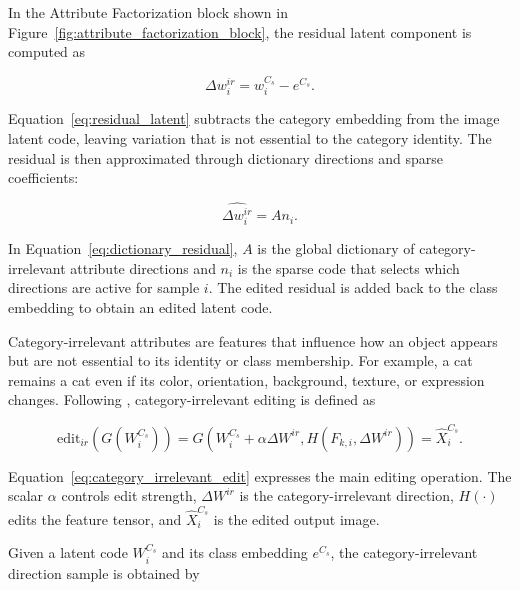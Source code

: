 In the Attribute Factorization block shown in Figure~\ref{fig:attribute_factorization_block}, the residual latent component is computed as

\begin{equation}
    \Delta w_i^{ir} = w_i^{C_s} - e^{C_s}.
    \label{eq:residual_latent}
\end{equation}

Equation~\eqref{eq:residual_latent} subtracts the category embedding from the image latent code, leaving variation that is not essential to the category identity. The residual is then approximated through dictionary directions and sparse coefficients:

\begin{equation}
    \widehat{\Delta w_i^{ir}} = A n_i.
    \label{eq:dictionary_residual}
\end{equation}

In Equation~\eqref{eq:dictionary_residual}, $A$ is the global dictionary of category-irrelevant attribute directions and $n_i$ is the sparse code that selects which directions are active for sample $i$. The edited residual is added back to the class embedding to obtain an edited latent code.

Category-irrelevant attributes are features that influence how an object appears but are not essential to its identity or class membership. For example, a cat remains a cat even if its color, orientation, background, texture, or expression changes. Following \citet{ding2023stableattributegroupediting}, category-irrelevant editing is defined as

\begin{equation}
    \mathrm{edit}_{ir}(G(W_i^{C_s})) =
    G\left(W_i^{C_s} + \alpha \Delta W^{ir}, H(F_{k,i}, \Delta W^{ir})\right)
    = \hat{X}_i^{C_s}.
    \label{eq:category_irrelevant_edit}
\end{equation}

Equation~\eqref{eq:category_irrelevant_edit} expresses the main editing operation. The scalar $\alpha$ controls edit strength, $\Delta W^{ir}$ is the category-irrelevant direction, $H(\cdot)$ edits the feature tensor, and $\hat{X}_i^{C_s}$ is the edited output image.

Given a latent code $W_i^{C_s}$ and its class embedding $e^{C_s}$, the category-irrelevant direction sample is obtained by

